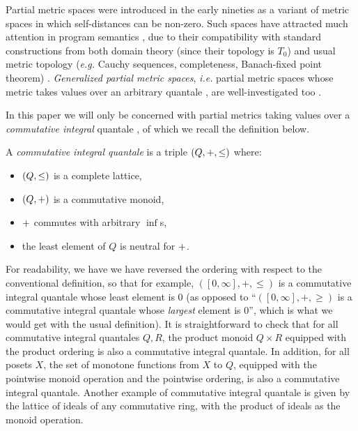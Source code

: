 



Partial metric spaces were  introduced in the early nineties as a variant of metric spaces in which self-distances can be non-zero. Such spaces have attracted much attention in program semantics
\cite{bkmp:partial-metrics, Bukatin1997, doi:10.1111/j.1749-6632.1994.tb44144.x, Schellekens2004, Samet:2013aa, Stubbe2018, HE201999}, due to their compatibility with standard constructions from both domain theory (since their topology is $T_{0}$) and usual metric topology (\textit{e.g.} Cauchy sequences, completeness, Banach-fixed point theorem) \cite{bkmp:partial-metrics, doi:10.1111/j.1749-6632.1994.tb44144.x}.
\emph{Generalized partial metric spaces}, \textit{i.e.} partial metric spaces whose metric takes values over an arbitrary quantale \cite{Hofmann2014}, are well-investigated too \cite{AGT2000,AGT7849}. 

In this paper we will only be concerned with partial metrics taking values over a \emph{commutative integral} quantale \cite{Hofmann2014}, of which we recall the definition below.

\begin{definition} A \emph{commutative integral quantale} is a triple $(Q, +, \leq)$ where:
\begin{itemize}
\item $(Q, \leq)$ is a complete lattice,
\item $(Q, +)$ is a commutative monoid,
\item $+$ commutes with arbitrary $\inf$s,
\item the least element of $Q$ is neutral for $+$.
\end{itemize}
\end{definition}

For readability, we have we have reversed the ordering with respect to the conventional definition, so that for example, $([0,\infty], +, \leq)$ is a commutative integral quantale whose least element is $0$  (as opposed to ``$([0,\infty], +, \geq)$ is a commutative integral quantale whose \emph{largest} element is $0$'', which is what we would get with the usual definition). It is straightforward to check that for all commutative integral quantales $Q,R$, the product monoid $Q \times R$ equipped with the product ordering is also a commutative integral quantale. In addition, for all posets $X$, the set of monotone functions from $X$ to $Q$, equipped with the pointwise monoid operation and the pointwise ordering, is also a commutative integral quantale. Another example of commutative integral quantale is given by the lattice of ideals of any commutative ring, with the product of ideals as the monoid operation.


